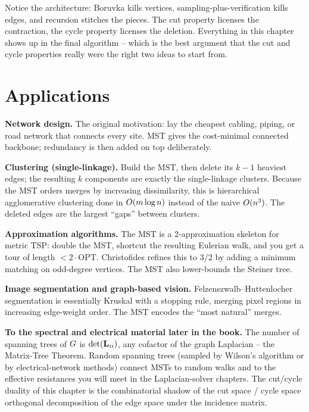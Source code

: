 \begin{aestheticbox}
Notice the architecture: Boruvka kills vertices, sampling-plus-verification kills edges, and recursion stitches the pieces. The cut property licenses the contraction, the cycle property licenses the deletion. Everything in this chapter shows up in the final algorithm -- which is the best argument that the cut and cycle properties really were the right two ideas to start from.
\end{aestheticbox}

\section{Applications}

\begin{applicationbox}
\textbf{Network design.} The original motivation: lay the cheapest cabling, piping, or road network that connects every site. MST gives the cost-minimal connected backbone; redundancy is then added on top deliberately.
\end{applicationbox}

\begin{applicationbox}
\textbf{Clustering (single-linkage).} Build the MST, then delete its $k-1$ heaviest edges; the resulting $k$ components are exactly the single-linkage clusters. Because the MST orders merges by increasing dissimilarity, this is hierarchical agglomerative clustering done in $O(m\log n)$ instead of the naive $O(n^3)$. The deleted edges are the largest ``gaps'' between clusters.
\end{applicationbox}

\begin{applicationbox}
\textbf{Approximation algorithms.} The MST is a $2$-approximation skeleton for metric TSP: double the MST, shortcut the resulting Eulerian walk, and you get a tour of length $<2\cdot\mathrm{OPT}$. Christofides refines this to $3/2$ by adding a minimum matching on odd-degree vertices. The MST also lower-bounds the Steiner tree.
\end{applicationbox}

\begin{applicationbox}
\textbf{Image segmentation and graph-based vision.} Felzenszwalb--Huttenlocher segmentation is essentially Kruskal with a stopping rule, merging pixel regions in increasing edge-weight order. The MST encodes the ``most natural'' merges.
\end{applicationbox}

\begin{connectionbox}
\textbf{To the spectral and electrical material later in the book.} The number of spanning trees of $G$ is $\det(\mathbf{L}_{ii})$, any cofactor of the graph Laplacian -- the Matrix-Tree Theorem. Random spanning trees (sampled by Wilson's algorithm or by electrical-network methods) connect MSTs to random walks and to the effective resistances you will meet in the Laplacian-solver chapters. The cut/cycle duality of this chapter is the combinatorial shadow of the cut space / cycle space orthogonal decomposition of the edge space under the incidence matrix.
\end{connectionbox}

